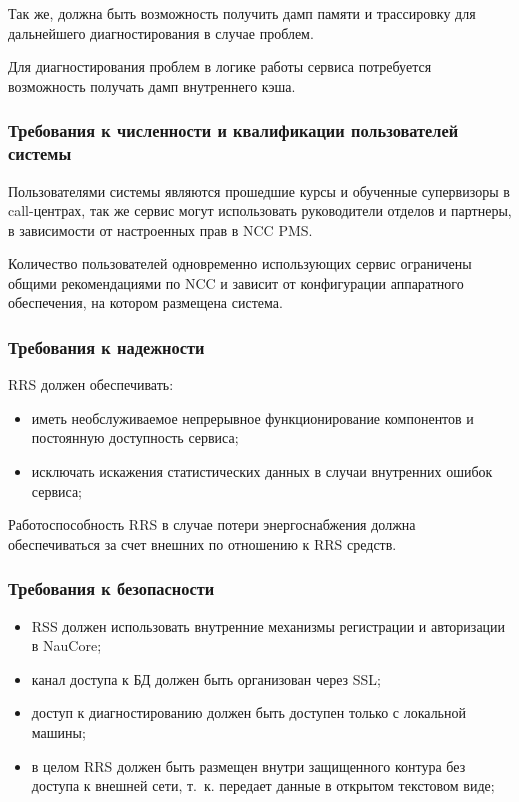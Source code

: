 Так же, должна быть возможность получить дамп памяти и трассировку для дальнейшего диагностирования в случае проблем.

Для диагностирования проблем в логике работы сервиса потребуется возможность получать дамп внутреннего кэша.

\subsubsection{Требования к численности и квалификации пользователей системы}

Пользователями системы являются прошедшие курсы и обученные супервизоры в call-центрах,
так же сервис могут использовать руководители отделов и партнеры,
в зависимости от настроенных прав в NCC PMS\@.

Количество пользователей одновременно использующих сервис ограничены
общими рекомендациями по NCC и зависит от конфигурации аппаратного обеспечения,
на котором размещена система.

\subsubsection{Требования к надежности}

RRS должен обеспечивать:
\begin{itemize}
    \item иметь необслуживаемое непрерывное функционирование компонентов и постоянную доступность сервиса;
    \item исключать искажения статистических данных в случаи внутренних ошибок сервиса;
\end{itemize}

Работоспособность RRS в случае потери энергоснабжения должна обеспечиваться за счет внешних по отношению к RRS средств.

\subsubsection{Требования к безопасности}
\begin{itemize}
    \item RSS должен использовать внутренние механизмы регистрации и авторизации в NauCore;
    \item канал доступа к БД должен быть организован через SSL\@;
    \item доступ к диагностированию должен быть доступен только с локальной машины;
    \item в целом RRS должен быть размещен внутри защищенного контура без доступа к внешней сети, т.~к. передает данные в открытом текстовом виде;
\end{itemize}

